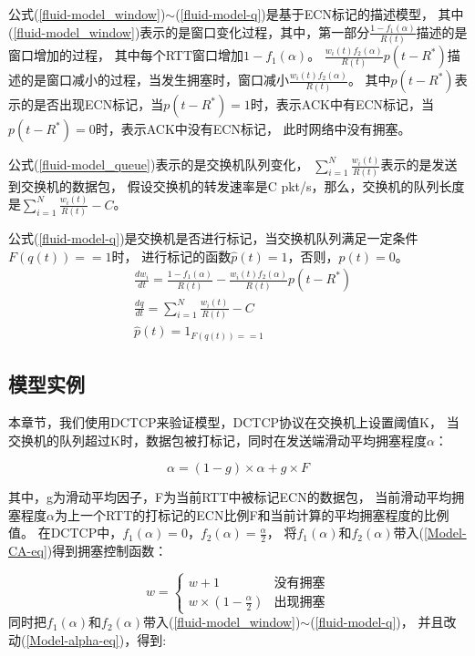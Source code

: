 公式(\ref{fluid-model_window})$\sim$(\ref{fluid-model-q})是基于ECN标记的描述模型，
其中(\ref{fluid-model_window})表示的是窗口变化过程，其中，第一部分$\frac{1-f_1(\alpha)}{R(t)}$描述的是窗口增加的过程，
其中每个RTT窗口增加$1-f_1(\alpha)$。
$\frac{w_i(t)f_2(\alpha)}{R(t)}p(t-R^*)$描述的是窗口减小的过程，当发生拥塞时，窗口减小$\frac{w_i(t)f_2(\alpha)}{R(t)}$。
其中$p(t-R^*)$表示的是否出现ECN标记，当$p(t-R^*)=1$时，表示ACK中有ECN标记，当$p(t-R^*)=0$时，表示ACK中没有ECN标记，
此时网络中没有拥塞。

公式(\ref{fluid-model_queue})表示的是交换机队列变化，
$ \sum_{i=1}^N{\frac{w_i(t)}{R(t)}}$表示的是发送到交换机的数据包，
假设交换机的转发速率是C pkt/s，那么，交换机的队列长度是$\sum_{i=1}^N{\frac{w_i(t)}{R(t)}}-C \label{fluid-model_queue}$。

公式(\ref{fluid-model-q})是交换机是否进行标记，当交换机队列满足一定条件$F({q}(t))==1$时，
进行标记的函数$\widehat{p}(t)=1$，否则，$\widehat{p}(t)=0$。
 \begin{align}
&\frac{dw_i}{dt}=\frac{1-f_1(\alpha)}{R(t)}-\frac{w_i(t)f_2(\alpha)}{R(t)}p(t-R^*)  \label{fluid-model_window} \\
&\frac{dq}{dt}= \sum_{i=1}^N{\frac{w_i(t)}{R(t)}}-C \label{fluid-model_queue}  \\
&\widehat{p}(t)=1_{F({q}(t))==1}  \label{fluid-model-q}
\end{align}




\subsection{模型实例}

本章节，我们使用DCTCP\cite{DCTCP}来验证模型，DCTCP协议在交换机上设置阈值K，
当交换机的队列超过K时，数据包被打标记，同时在发送端滑动平均拥塞程度$\alpha$：

\begin{equation}
\alpha=(1-g)\times \alpha+g\times F
\label{Model-alpha-eq}
\end{equation}

其中，g为滑动平均因子，F为当前RTT中被标记ECN的数据包，
当前滑动平均拥塞程度$\alpha$为上一个RTT的打标记的ECN比例F和当前计算的平均拥塞程度的比例值。
在DCTCP中，$f_1(\alpha)=0$，$f_2(\alpha)=\frac{\alpha}{2}$，
将$f_1(\alpha)$和$f_2(\alpha)$带入(\ref{Model-CA-eq})得到拥塞控制函数：

\begin{equation}
w=
\begin{cases}
w+1 &\text{没有拥塞}\\
w \times (1-\frac{\alpha}{2}) &\text{出现拥塞}
\end{cases}
\label{Model-CA-DCTCP-eq}
\end{equation}
同时把$f_1(\alpha)$和$f_2(\alpha)$带入(\ref{fluid-model_window})$\sim$(\ref{fluid-model-q})，
并且改动(\ref{Model-alpha-eq})，得到:

